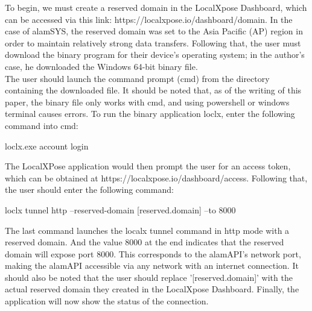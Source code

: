 To begin, we must create a reserved domain in the LocalXpose Dashboard, 
which can be accessed via this link: https://localxpose.io/dashboard/domain.  
In the case of alamSYS, the reserved domain was set to the Asia Pacific (AP) 
region in order to maintain relatively strong data transfers. Following that, 
the user must download the binary program for their device's operating system; 
in the author's case, he downloaded the Windows 64-bit binary file.
\\

The user should launch the command prompt (cmd) from the directory containing 
the downloaded file. It should be noted that, as of the writing of this paper, 
the binary file only works with cmd, and using powershell or windows terminal 
causes errors. To run the binary application loclx, 
enter the following command into cmd:
\hfill \\
\begin{python}
    loclx.exe account login
\end{python}

The LocalXPose application would then prompt the user for an access token, 
which can be obtained at https://localxpose.io/dashboard/access. 
Following that, the user should enter the following command:
\hfill \\
\begin{python}
    loclx tunnel http --reserved-domain [reserved.domain] --to 8000
\end{python}

The last command launches the localx tunnel command in http mode with a 
reserved domain. And the value 8000 at the end indicates that the reserved 
domain will expose port 8000. This corresponds to the alamAPI's network port, 
making the alamAPI accessible via any network with an internet connection. 
It should also be noted that the user should replace '[reserved.domain]' 
with the actual reserved domain they created in the LocalXpose Dashboard.
Finally, the application will now show the status of the connection.
